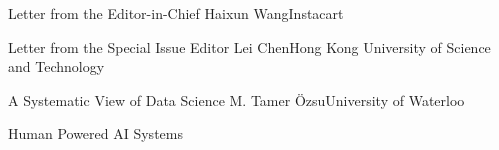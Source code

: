 \documentclass[11pt]{article}
\begin{document}


\begin{bulletin}


%
%

\begin{lettersection}
\begin{letter}{Letter from the Editor-in-Chief}
{Haixun Wang}{Instacart}

\end{letter}
%
\newpage
%
%
\begin{letter}{Letter from the Special Issue Editor}
{Lei Chen}{Hong Kong University of Science and Technology}

\end{letter}

\end{lettersection}


\begin{opinionsection}
\begin{opinion}{A Systematic View of Data Science}
{M. Tamer \"{O}zsu}{University of Waterloo}

\end{opinion}
\end{opinionsection}

\begin{articlesection}{Human Powered AI Systems}


\end{articlesection}
\end{bulletin}
\end{document}
